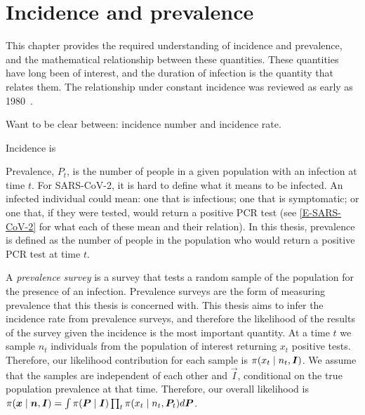 \documentclass[thesis.tex]{subfiles}
\begin{document}
\chapter{Incidence and prevalence} \label{incidence-prevalence}

This chapter provides the required understanding of incidence and prevalence, and the mathematical relationship between these quantities.
These quantities have long been of interest, and the duration of infection is the quantity that relates them.
The relationship under constant incidence was reviewed as early as 1980~\autocite{freemanPrevalence}.

Want to be clear between: incidence number and incidence rate.

Incidence is

Prevalence, $P_t$, is the number of people in a given population with an infection at time $t$.
For SARS-CoV-2, it is hard to define what it means to be infected.
An infected individual could mean: one that is infectious; one that is symptomatic; or one that, if they were tested, would return a positive PCR test (see \cref{E-SARS-CoV-2} for what each of these mean and their relation).
In this thesis, prevalence is defined as the number of people in the population who would return a positive PCR test at time $t$.

A \emph{prevalence survey} is a survey that tests a random sample of the population for the presence of an infection.
Prevalence surveys are the form of measuring prevalence that this thesis is concerned with.
This thesis aims to infer the incidence rate from prevalence surveys, and therefore the likelihood of the results of the survey given the incidence is the most important quantity.
At a time $t$ we sample $n_t$ individuals from the population of interest returning $x_t$ positive tests.
Therefore, our likelihood contribution for each sample is $\operatorname{\pi}(x_t \mid n_t, \bm{I})$.
We assume that the samples are independent of each other and $\vec{I}$, conditional on the true population prevalence at that time.
Therefore, our overall likelihood is $\operatorname{\pi}(\bm{x} \mid \bm{n}, \bm{I}) = \int \operatorname{\pi}(\bm{P} \mid \bm{I}) \prod_t \operatorname{\pi}(x_t \mid n_t, \bm{P}_t) d\bm{P}$.
\end{document}
